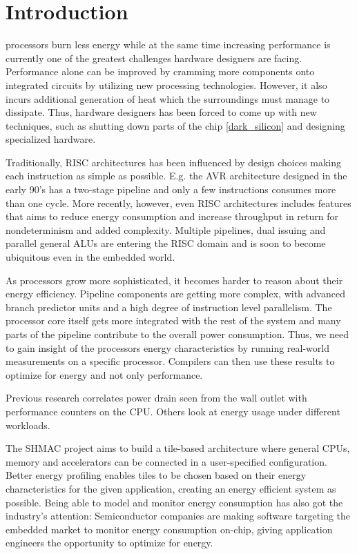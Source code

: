 \section{Introduction}

 processors burn less energy while at the same time
increasing performance is currently one of the greatest challenges hardware
designers are facing. Performance alone can be improved by cramming more
components onto integrated circuits \cite{moore1965cramming} by utilizing new
processing technologies. However, it also incurs additional generation of heat
which the surroundings must manage to dissipate. Thus, hardware designers has
been forced to come up with new techniques, such as shutting down parts of the
chip \ref{dark_silicon} and designing specialized hardware.

Traditionally, RISC architectures has been influenced by design choices making
each instruction as simple as possible\cite{sivarama}. E.g. the AVR architecture
designed in the early 90's has a two-stage pipeline and only a few instructions
consumes more than one cycle. More recently, however, even RISC architectures
includes features that aims to reduce energy consumption and increase throughput
in return for nondeterminism and added complexity. Multiple pipelines, dual
issuing and parallel general ALUs are entering the RISC domain and is soon to
become ubiquitous even in the embedded world.

As processors grow more sophisticated, it becomes harder to reason about their
energy efficiency. Pipeline components are getting more complex, with advanced
branch predictor units and a high degree of instruction level parallelism. The
processor core itself gets more integrated with the rest of the system and many
parts of the pipeline contribute to the overall power consumption\cite{bertran}.
Thus, we need to gain insight of the processors energy characteristics by
running real-world measurements on a specific processor. Compilers can then use
these results to optimize for energy and not only performance.

Previous research correlates power drain seen from the wall outlet with
performance counters on the CPU\cite{singh}\cite{bertran}\cite{bircher}. Others
look at energy usage under different workloads\cite{carrol2010analysis}.

The SHMAC project\cite{shmac} aims to build a tile-based architecture where
general CPUs, memory and accelerators can be connected in a user-specified
configuration. Better energy profiling enables tiles to be chosen based on their
energy characteristics for the given application, creating an energy efficient
system as possible. Being able to model and monitor energy consumption has also
got the industry's attention: Semiconductor companies are making software
targeting the embedded market to monitor energy consumption on-chip, giving
application engineers the opportunity to optimize for energy.

